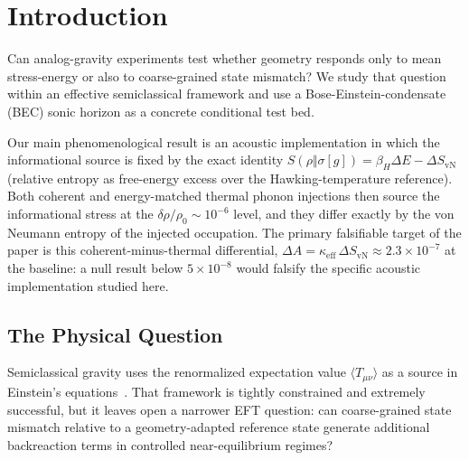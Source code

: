 \documentclass[aps,prd,twocolumn,superscriptaddress,nofootinbib,floatfix]{revtex4-2}
\begin{document}
\begin{abstract}
\end{abstract}

\maketitle


\section{Introduction}
\label{sec:intro}

Can analog-gravity experiments test whether geometry responds only to mean stress-energy or also to coarse-grained state mismatch? We study that question within an effective semiclassical framework and use a Bose-Einstein-condensate (BEC) sonic horizon as a concrete conditional test bed.

Our main phenomenological result is an acoustic implementation in which the informational source is fixed by the exact identity $S(\rho\Vert\sigma[g]) = \beta_H \Delta E - \Delta S_{\mathrm{vN}}$ (relative entropy as free-energy excess over the Hawking-temperature reference). Both coherent and energy-matched thermal phonon injections then source the informational stress at the $\delta\rho/\rho_0 \sim 10^{-6}$ level, and they differ exactly by the von Neumann entropy of the injected occupation. The primary falsifiable target of the paper is this coherent-minus-thermal differential, $\Delta A = \kappa_{\mathrm{eff}}\,\Delta S_{\mathrm{vN}} \approx 2.3\times10^{-7}$ at the baseline: a null result below $5\times10^{-8}$ would falsify the specific acoustic implementation studied here.

\subsection{The Physical Question}

Semiclassical gravity uses the renormalized expectation value $\langle T_{\mu\nu}\rangle$ as a source in Einstein's equations~\cite{HuVerdaguer2008}. That framework is tightly constrained and extremely successful, but it leaves open a narrower EFT question: can coarse-grained state mismatch relative to a geometry-adapted reference state generate additional backreaction terms in controlled near-equilibrium regimes?
\end{document}

